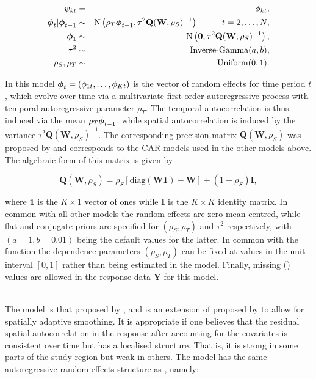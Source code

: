 \documentclass[article, nojss]{jss}
\newcommand{\bd}[1]{\ensuremath{\mbox{\boldmath $#1$}}}
\begin{document}
\begin{eqnarray}
\psi_{kt}&=&\phi_{kt},\label{carar}\\
\bd{\phi}_t|\bd{\phi}_{t-1} & \sim & \mbox{N}\left(\rho_T\bd{\phi}_{t-1}, \tau^{2} \mathbf{Q}(\mathbf{W},\rho_S)^{-1}\right)\hspace{1cm} t=2,\ldots,N,\nonumber\\
\bd{\phi}_1 & \sim & \mbox{N}\left(\mathbf{0}, \tau^{2} \mathbf{Q}(\mathbf{W},\rho_S)^{-1}\right),\nonumber\\
\tau^2&\sim&\mbox{Inverse-Gamma}(a,b),\nonumber\\
\rho_S,\rho_T&\sim&\mbox{Uniform}(0,1).\nonumber
\end{eqnarray}

In this model $\bd{\phi}_{t}=(\phi_{1t},\ldots,\phi_{Kt})$ is the vector of random effects for time period $t$, which  evolve over time via a multivariate first order autoregressive process with temporal autoregressive parameter $\rho_T$. The temporal autocorrelation is thus induced via the mean $\rho_T\bd{\phi}_{t-1}$, while spatial autocorrelation is induced by the variance $\tau^{2} \mathbf{Q}(\mathbf{W},\rho_S)^{-1}$. The corresponding precision matrix $\mathbf{Q}(\mathbf{W},\rho_S)$ was proposed by \cite{leroux2000} and corresponds to the CAR models used in the other models above. The algebraic form of this matrix is given by

\begin{equation}
\mathbf{Q}(\mathbf{W},\rho_S)=\rho_S[\mbox{diag}(\mathbf{W}\mathbf{1}) - \mathbf{W}] + (1-\rho_S)\mathbf{I},\label{Lerouxjoint}
\end{equation}

where $\mathbf{1}$ is the $K\times 1$ vector of ones while $\mathbf{I}$ is the $K\times K$ identity matrix. In common with all other models the random effects are zero-mean centred, while flat and conjugate priors are specified for $(\rho_S, \rho_T)$ and $\tau^2$ respectively, with $(a=1, b=0.01)$ being the default values for the latter. In common with the  function the  dependence parameters $(\rho_{S}, \rho_{T})$ can be fixed at values in the unit interval $[0,1]$ rather than being estimated in the model. Finally, missing () values are allowed in the response data $\mathbf{Y}$ for this model.\vspace{1cm}


\\
The model is that proposed by \cite{rushworth2016}, and is an extension of  proposed by \cite{rushworth2014} to allow for spatially adaptive smoothing. It is appropriate if one believes that the residual spatial autocorrelation in the response after accounting for the covariates is consistent over time but has a localised structure. That is, it is strong in some parts of the study region but weak in others. The model has the same autoregressive random effects structure as  , namely:
\end{document}
